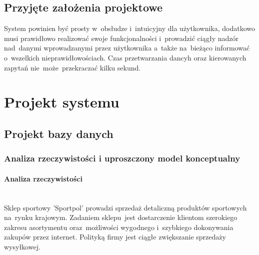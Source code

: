 \documentclass[a4paper, 12pt]{article}
\begin{document}
\subsection{Przyjęte założenia projektowe}
System powinien być prosty w~obsłudze i~intuicyjny dla użytkownika, dodatkowo musi prawidłowo realizować swoje funkcjonalności i~prowadzić ciągły nadzór nad~danymi wprowadzanymi przez użytkownika a~także na~bieżąco informować o~wszelkich nieprawidłowościach. Czas przetwarzania dancyh oraz kierowanych zapytań nie~może~przekraczać kilku sekund.
\cleardoublepage
\section{Projekt systemu}
\subsection{Projekt bazy danych}
\subsubsection{Analiza rzeczywistości i uproszczony model konceptualny}
\paragraph{Analiza rzeczywistości} \mbox{}\\
Sklep sportowy 'Sportpol' prowadzi sprzedaż detaliczną produktów sportowych na~rynku krajowym. Zadaniem sklepu~jest dostarczenie klientom szerokiego zakresu asortymentu oraz~możliwości wygodnego i~szybkiego dokonywania zakupów przez internet. Polityką firmy jest ciągłe zwiększanie sprzedaży wysyłkowej.
\end{document}
